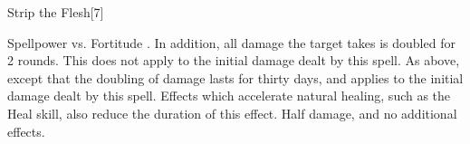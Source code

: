 \begin{spellsection}{Strip the Flesh}[7]
    \begin{spellheader}
    \end{spellheader}
    \begin{spellcontent}
        \begin{spelltargetinginfo}
        \end{spelltargetinginfo}
        \begin{spelleffects}
            \begin{spellattack}{Spellpower vs. Fortitude}
                \spellsuccess {}. In addition, all damage the target takes is doubled for 2 rounds.
                This does not apply to the initial damage dealt by this spell.
                \spellcritical As above, except that the doubling of damage lasts for thirty days, and applies to the initial damage dealt by this spell.
                Effects which accelerate natural healing, such as the Heal skill, also reduce the duration of this effect.
                \spellfailure Half damage, and no additional effects.
            \end{spellattack}
        \end{spelleffects}
    \end{spellcontent}
    \begin{spellfooter}
        \spellnotes \physicalspellnotes
        \miscastrandom
    \end{spellfooter}
\end{spellsection}

